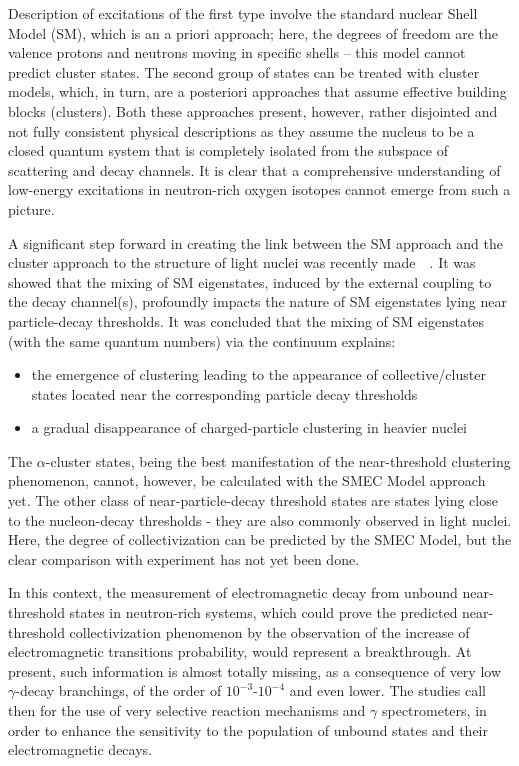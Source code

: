\bigbreak

Description of excitations of the first type involve the standard nuclear
Shell Model (SM), which is an a priori approach; here, the degrees of freedom
are the valence protons and neutrons moving in specific shells – this model
cannot predict cluster states.
The second group of states can be treated with cluster models, which, in turn,
are a posteriori approaches that assume effective building blocks (clusters).
Both these approaches present, however, rather disjointed and not fully
consistent physical descriptions as they assume the nucleus to be a closed
quantum system that is completely isolated from the subspace of scattering and
decay channels. It is clear that a comprehensive understanding of low-energy
excitations in neutron-rich oxygen isotopes cannot emerge from such a picture.

\bigbreak

A significant step forward in creating the link between the SM approach and
the cluster approach to the structure of light nuclei was recently
made~\cite{oko:cluster}~\cite{oko:origin}.
It was showed that the mixing of SM eigenstates, induced by the external
coupling to the decay channel(s), profoundly impacts the nature of SM
eigenstates lying near particle-decay thresholds. 
It was concluded that the mixing of SM eigenstates (with the same quantum
numbers) via the continuum explains:

\begin{itemize}
\item the emergence of clustering leading to the appearance of
collective/cluster states located near the corresponding particle decay
thresholds
\item a gradual disappearance of charged-particle clustering in heavier nuclei
\end{itemize}

The $\alpha$-cluster states, being the best manifestation of the near-threshold
clustering phenomenon, cannot, however, be calculated with the SMEC Model
approach yet. The other class of near-particle-decay threshold states are
states lying close to the nucleon-decay thresholds - they are also
commonly observed in light nuclei. Here, the degree of collectivization can be
predicted by the SMEC Model, but the clear comparison with experiment has not
yet been done. 

\bigbreak

In this context, the measurement of electromagnetic decay from unbound
near-threshold states in neutron-rich systems, which could prove the predicted
near-threshold collectivization phenomenon by the observation of the increase
of electromagnetic transitions probability, would represent a breakthrough.
At present, such information is almost totally missing, as a consequence of
very low  $\gamma$-decay branchings, of the order of $10^{-3}$-$10^{-4}$ and
even lower. The studies call then for the use of very selective reaction
mechanisms and $\gamma$ spectrometers, in order to enhance the sensitivity to
the population of unbound states and their electromagnetic decays.